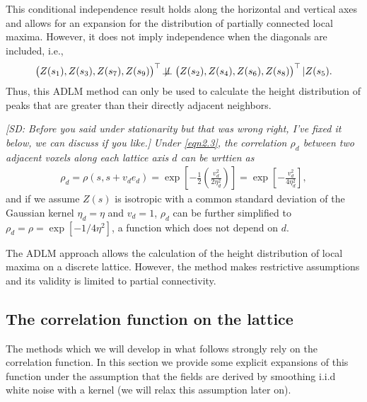 \documentclass{article}
\newcommand{\sdcom}[1]{\textit{\color{red} [SD: #1]}}
\newcommand{\nt}[1]{\textit{\color{red} #1}}
\begin{document}
This conditional independence result holds along the horizontal and vertical axes and allows for an expansion for the distribution of partially connected local maxima. However, it does not imply independence when the diagonals are included, i.e.,
\begin{align*}
\left(Z(s_1), Z(s_3), Z(s_7), Z(s_9) \right)^\top
\not\!\perp\!\!\!\perp
\left(Z(s_2), Z(s_4), Z(s_6), Z(s_8) \right)^\top | Z(s_5).
\end{align*}
Thus, this ADLM method can only be used to calculate the height distribution of peaks that are greater than their directly adjacent neighbors. 

\sdcom{Before you said under stationarity but that was wrong right, I've fixed it below, we can discuss if you like.} \nt{Under \ref{eqn2.3}, the correlation $\rho_d$ between two adjacent voxels along each lattice axis $d$ can be wrttien as}
\begin{align}
\rho_d = \rho(s, s+ v_de_d) = \exp\left[-\frac{1}{2}\left(\frac{v_d^2}{2\eta_d^2}\right)\right] = \exp\left[-\frac{v_d^2}{4\eta_d^2}\right], \label{eqn2.32}
\end{align}
and if we assume $Z(s)$ is isotropic with a common standard deviation of the Gaussian kernel $\eta_d = \eta$ and $v_d = 1$, $\rho_d$ can be further simplified to $\rho_d = \rho = \exp[-1/4\eta^2]$, a function which does not depend on $d$.

The ADLM approach allows the calculation of the height distribution of local maxima on a discrete lattice. However, the method makes restrictive assumptions and its validity is limited to partial connectivity.

\subsection{The correlation function on the lattice}\label{SScorrfn}
The methods which we will develop in what follows strongly rely on the correlation function.  In this section we provide some explicit expansions of this function under the assumption that the fields are derived by smoothing i.i.d white noise with a kernel (we will relax this assumption later on).
\end{document}
